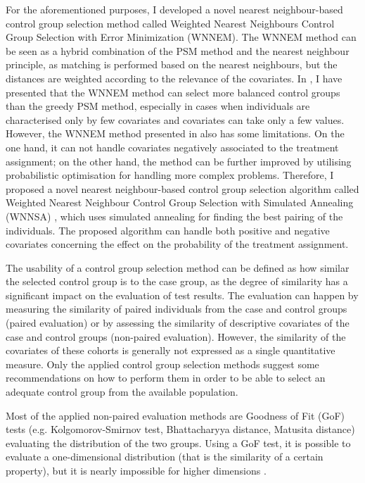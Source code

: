 For the aforementioned purposes, I developed a novel nearest neighbour-based control group selection method called Weighted Nearest Neighbours Control Group Selection with Error Minimization (WNNEM). The WNNEM method can be seen as a hybrid combination of the PSM method and the nearest neighbour principle, as matching is performed based on the nearest neighbours, but the distances are weighted according to the relevance of the covariates. In \cite{szeker2020weighted}, I have presented that the WNNEM method can select more balanced control groups than the greedy PSM method, especially in cases when individuals are characterised only by few covariates and covariates can take only a few values. However, the WNNEM method presented in \cite{szeker2020weighted} also has some limitations. On the one hand, it can not handle covariates negatively associated to the treatment assignment; on the other hand, the method can be further improved by utilising probabilistic optimisation for handling more complex problems. Therefore, I proposed a novel nearest neighbour-based control group selection algorithm called Weighted Nearest Neighbour Control Group Selection with Simulated Annealing (WNNSA) \cite{szeker2021optimized}, which uses simulated annealing for finding the best pairing of the individuals. The proposed algorithm can handle both positive and negative covariates concerning the effect on the probability of the treatment assignment.

The usability of a control group selection method can be defined as how similar the selected control group is to the case group, as the degree of similarity has a significant impact on the evaluation of test results. The evaluation can happen by measuring the similarity of paired individuals from the case and control groups (paired evaluation) or by assessing the similarity of descriptive covariates of the case and control groups (non-paired evaluation). However, the similarity of the covariates of these cohorts is generally not expressed as a single quantitative measure. Only the applied control group selection methods suggest some recommendations on how to perform them in order to be able to select an adequate control group from the available population.

Most of the applied non-paired evaluation methods are Goodness of Fit (GoF) tests (e.g. Kolgomorov-Smirnov test, Bhattacharyya distance, Matusita distance) \cite{mielke2007permutation, berry2011permutation} evaluating the distribution of the two groups. Using a GoF test, it is possible to evaluate a one-dimensional distribution (that is the similarity of a certain property), but it is nearly impossible for higher dimensions \cite{fasano1987multidimensional}.

